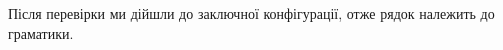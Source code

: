 \begin{itemize}
    







\end{itemize}

Після перевірки ми дійшли до заключної конфігурації, отже рядок належить до граматики.


